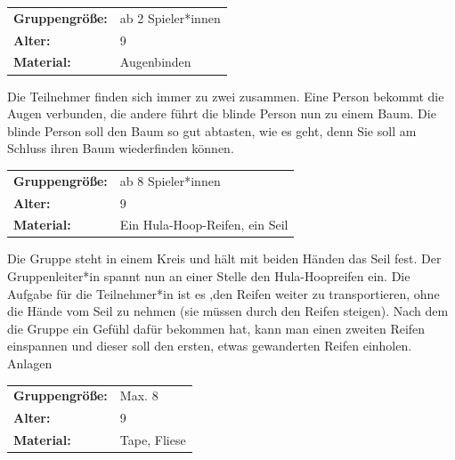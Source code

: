 \begin{table}[H]
\begin{tabular}{>{\bfseries}lp{8cm}}
   Gruppengröße:   & ab 2 Spieler*innen\\
    Alter: & 9 \\
    Material: & Augenbinden \\ 
\end{tabular}
\end{table} 
Die Teilnehmer finden sich immer zu zwei zusammen. Eine Person bekommt die Augen verbunden, die andere führt die blinde Person nun zu einem Baum. Die blinde Person soll den Baum so gut abtasten, wie es geht, denn Sie soll am Schluss ihren Baum wiederfinden können.


\begin{table}[H]
\begin{tabular}{>{\bfseries}lp{8cm}}
   Gruppengröße:   & ab 8 Spieler*innen\\
    Alter: & 9 \\
    Material: & Ein Hula-Hoop-Reifen, ein Seil\\ 
\end{tabular}
\end{table} 

Die Gruppe steht in einem Kreis und hält mit beiden Händen das Seil fest. Der Gruppenleiter*in spannt nun an einer Stelle den Hula-Hoopreifen ein. Die Aufgabe für die Teilnehmer*in ist es ,den Reifen weiter zu transportieren, ohne die Hände vom Seil zu nehmen (sie müssen durch den Reifen steigen). Nach dem die Gruppe ein Gefühl dafür bekommen hat, kann man einen zweiten Reifen einspannen und dieser soll den ersten, etwas gewanderten Reifen einholen.
Anlagen

\begin{table}[H]
\begin{tabular}{>{\bfseries}lp{8cm}}
   Gruppengröße:   & Max. 8\\
    Alter: & 9 \\
    Material: & Tape, Fliese \\ 
\end{tabular}
\end{table} 

